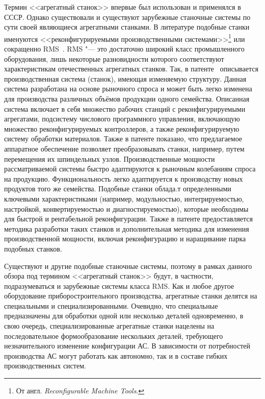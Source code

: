 Термин <<агрегатный станок>> впервые был использован и применялся в СССР. Однако существовали и существуют зарубежные станочные системы по сути своей являющиеся агрегатными станками. В литературе подобные станки именуются <<реконфигурируемыми производственными системами>>\footnote{От англ. \textit{Reconfigurable Machine Tools}.} или сокращенно RMS~\cite{lee1997reconfigurability, mehrabi2000}. RMS "--- это достаточно широкий класс промышленного оборудования, лишь некоторые разновидности которого соответствуют характеристикам отечественных агрегатных станков.  Так, в патенте~\cite{US6349237} описывается производственная система (станок), имеющая изменяемую структуру. Данная система разработана на основе рыночного спроса и может быть легко изменена для производства различных объёмов продукции одного семейства. Описанная система включает в себя множество рабочих станций с реконфигурируемыми агрегатами, подсистему числового программного управления, включающую множество реконфигурируемых контроллеров, а также реконфигурируемую систему обработки материалов. Также в патенте показано, что предлагаемое аппаратное обеспечение позволяет преобразовывать станки, например, путем перемещения их шпиндельных узлов. Производственные мощности рассматриваемой системы быстро адаптируются к рыночным колебаниям спроса на продукцию. Функциональность легко адаптируется к производству новых продуктов того же семейства. Подобные станки облада.т определенными ключевыми характеристиками (например, модульностью, интегрируемостью, настройкой, конвертируемостью и диагностируемостью), которые необходимы для быстрой и рентабельной реконфигурации. Также в патенте предоставляется методика разработки таких станков и дополнительная методика для изменения производственной мощности, включая реконфигурацию и наращивание парка подобных станков. 

Существуют и другие подобные станочные системы, поэтому в рамках данного обзора под термином <<агрегатный станок>> будут, в частности, подразумеваться и зарубежные системы класса RMS. Как и любое другое оборудование приборостроительного производства, агрегатные станки делятся на специальными и специализированными. Очевидно, что специальные предназначены для обработки одной или несколько деталей одновременно, в свою очередь, специализированные агрегатные станки нацелены на последовательное формообразование нескольких деталей, требующего незначительного изменение конфигурации АС. В зависимости от потребностей производства АС могут работать как автономно, так и в составе гибких производственных систем.

